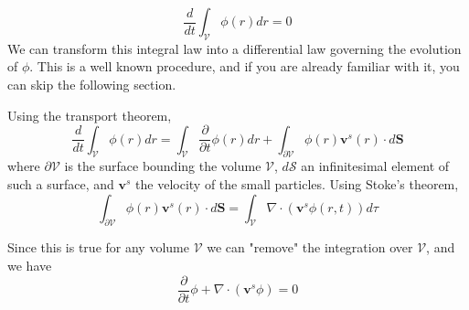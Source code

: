 \documentclass[11pt,a4paper]{report}
\newcommand{\p}[2]{\ensuremath{\frac{\partial {#1}}{\partial {#2}}}}
\newcommand{\tot}[2]{\ensuremath{\frac{d {#1}}{d {#2}}}}
\begin{document}
\begin{equation}
	\tot{}{t} \int_\mathcal{V} \phi(r) dr = 0
\end{equation}
We can transform this integral law into a differential law governing the evolution of $\phi$. This is a well known procedure, and if you are already familiar with it, you can skip the following section.

Using the transport theorem,
\begin{equation}
	\tot{}{t} \int_\mathcal{V} \phi(r) dr = \int_\mathcal{V} \p{}{t} \phi(r) dr + \int_{\partial\mathcal{V}} \phi(r) \mathbf{v}^s(r) \cdot d \mathbf{S}
\end{equation}
where $\partial \mathcal{V}$ is the surface bounding the volume $\mathcal{V}$, $d\mathcal{S}$ an infinitesimal element of such a surface, and $\mathbf{v}^s$ the velocity of the small particles.
Using Stoke's theorem,
\begin{equation}
	\int_{\partial\mathcal{V}} \phi(r) \mathbf{v}^s(r) \cdot d \mathbf{S} = \int_\mathcal{V} \nabla \cdot \left( \mathbf{v}^s \phi(r,t) \right) d\tau 
\end{equation}

Since this is true for any volume $\mathcal{V}$ we can "remove" the integration over $\mathcal{V}$, and we have
\begin{equation}
	\p{}{t}\phi + \nabla \cdot ( \mathbf{v}^s \phi ) = 0
\end{equation}
\end{document}
